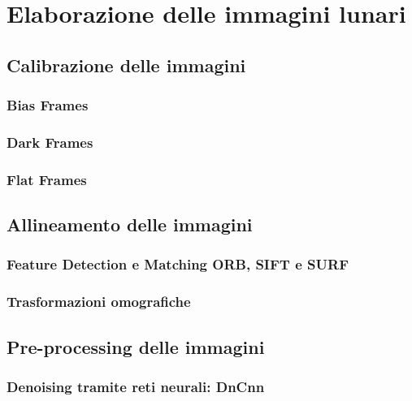 \chapter{Elaborazione delle immagini lunari} \label{chap:techniques}

\section{Calibrazione delle immagini} \label{sec:calibration}

\subsection{Bias Frames} \label{subsec:bias}

\subsection{Dark Frames} \label{subsec:dark}

\subsection{Flat Frames} \label{subsec:flat}

\section{Allineamento delle immagini} \label{sec:alignment}

\subsection{Feature Detection e Matching ORB, SIFT e SURF} \label{subsec:feature_detectoion}

\subsection{Trasformazioni omografiche} \label{subsec:homography}

\section{Pre-processing delle immagini} \label{sec:preprocessing}

\subsection{Denoising tramite reti neurali: DnCnn} \label{subsec:denoising}

